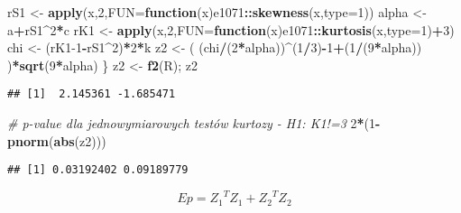 \documentclass[polish,]{book}
\newenvironment{Shaded}{\begin{snugshade}}{\end{snugshade}}
\newcommand{\CommentTok}[1]{\textcolor[rgb]{0.56,0.35,0.01}{\textit{#1}}}
\newcommand{\ControlFlowTok}[1]{\textcolor[rgb]{0.13,0.29,0.53}{\textbf{#1}}}
\newcommand{\DataTypeTok}[1]{\textcolor[rgb]{0.13,0.29,0.53}{#1}}
\newcommand{\DecValTok}[1]{\textcolor[rgb]{0.00,0.00,0.81}{#1}}
\newcommand{\KeywordTok}[1]{\textcolor[rgb]{0.13,0.29,0.53}{\textbf{#1}}}
\newcommand{\NormalTok}[1]{#1}
\newcommand{\OperatorTok}[1]{\textcolor[rgb]{0.81,0.36,0.00}{\textbf{#1}}}
\newcommand{\StringTok}[1]{\textcolor[rgb]{0.31,0.60,0.02}{#1}}
\begin{document}
\begin{Shaded}
\begin{Highlighting}[]
\NormalTok{  rS1 <-}\StringTok{ }\KeywordTok{apply}\NormalTok{(x,}\DecValTok{2}\NormalTok{,}\DataTypeTok{FUN=}\ControlFlowTok{function}\NormalTok{(x)e1071}\OperatorTok{::}\KeywordTok{skewness}\NormalTok{(x,}\DataTypeTok{type=}\DecValTok{1}\NormalTok{))}
\NormalTok{  alpha <-}\StringTok{ }\NormalTok{a}\OperatorTok{+}\NormalTok{rS1}\OperatorTok{^}\DecValTok{2}\OperatorTok{*}\NormalTok{c}
\NormalTok{  rK1 <-}\StringTok{ }\KeywordTok{apply}\NormalTok{(x,}\DecValTok{2}\NormalTok{,}\DataTypeTok{FUN=}\ControlFlowTok{function}\NormalTok{(x)e1071}\OperatorTok{::}\KeywordTok{kurtosis}\NormalTok{(x,}\DataTypeTok{type=}\DecValTok{1}\NormalTok{)}\OperatorTok{+}\DecValTok{3}\NormalTok{)}
\NormalTok{  chi <-}\StringTok{ }\NormalTok{(rK1}\DecValTok{-1}\OperatorTok{-}\NormalTok{rS1}\OperatorTok{^}\DecValTok{2}\NormalTok{)}\OperatorTok{*}\DecValTok{2}\OperatorTok{*}\NormalTok{k}
\NormalTok{  z2 <-}\StringTok{ }\NormalTok{( (chi}\OperatorTok{/}\NormalTok{(}\DecValTok{2}\OperatorTok{*}\NormalTok{alpha))}\OperatorTok{^}\NormalTok{(}\DecValTok{1}\OperatorTok{/}\DecValTok{3}\NormalTok{)}\OperatorTok{-}\DecValTok{1}\OperatorTok{+}\NormalTok{(}\DecValTok{1}\OperatorTok{/}\NormalTok{(}\DecValTok{9}\OperatorTok{*}\NormalTok{alpha)) )}\OperatorTok{*}\KeywordTok{sqrt}\NormalTok{(}\DecValTok{9}\OperatorTok{*}\NormalTok{alpha)}
\NormalTok{  \}}
\NormalTok{z2 <-}\StringTok{ }\KeywordTok{f2}\NormalTok{(R); z2}
\end{Highlighting}
\end{Shaded}

\begin{verbatim}
## [1]  2.145361 -1.685471
\end{verbatim}

\begin{Shaded}
\begin{Highlighting}[]
\CommentTok{# p-value dla jednowymiarowych testów kurtozy - H1: K1!=3}
\DecValTok{2}\OperatorTok{*}\NormalTok{(}\DecValTok{1}\OperatorTok{-}\KeywordTok{pnorm}\NormalTok{(}\KeywordTok{abs}\NormalTok{(z2)))}
\end{Highlighting}
\end{Shaded}

\begin{verbatim}
## [1] 0.03192402 0.09189779
\end{verbatim}

\begin{equation}
Ep={Z_1}^TZ_1+{Z_2}^TZ_2
\label{eq:wz1128}
\end{equation}

\begin{Shaded}
\end{Shaded}
\end{document}
